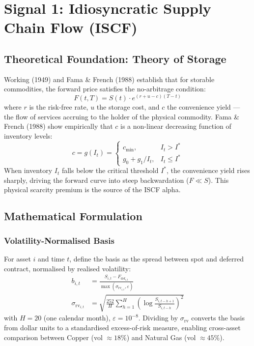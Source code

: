 \documentclass[11pt]{article}
\begin{document}
\section{Signal 1: Idiosyncratic Supply Chain Flow (ISCF)}

\subsection{Theoretical Foundation: Theory of Storage}

Working (1949) and Fama \& French (1988) establish that for storable commodities, the forward price satisfies the no-arbitrage condition:
\begin{equation}
F(t,T) = S(t) \cdot e^{(r + u - c)(T-t)}
\label{eq:no-arbitrage}
\end{equation}
where $r$ is the risk-free rate, $u$ the storage cost, and $c$ the convenience yield --- the flow of services accruing to the holder of the physical commodity. Fama \& French (1988) show empirically that $c$ is a non-linear decreasing function of inventory levels:
\begin{equation}
c = g(I_t) =
\begin{cases}
c_{\min}, & I_t > I^* \\
g_0 + g_1/I_t, & I_t \leq I^*
\end{cases}
\label{eq:convenience-yield}
\end{equation}
When inventory $I_t$ falls below the critical threshold $I^*$, the convenience yield rises sharply, driving the forward curve into steep backwardation ($F \ll S$). This physical scarcity premium is the source of the ISCF alpha.

\subsection{Mathematical Formulation}

\subsubsection{Volatility-Normalised Basis}

For asset $i$ and time $t$, define the basis as the spread between spot and deferred contract, normalised by realised volatility:
\begin{align}
b_{i,t} &= \frac{S_{i,t} - F_{\text{def}_{i,t}}}{\max(\sigma_{\text{rv}_{i,t}}, \varepsilon)} \label{eq:basis} \\
\sigma_{\text{rv}_{i,t}} &= \sqrt{\frac{252}{H} \sum_{h=1}^{H} \left(\log\frac{S_{i,t-h+1}}{S_{i,t-h}}\right)^2} \label{eq:realised-vol}
\end{align}
with $H = 20$ (one calendar month), $\varepsilon = 10^{-8}$. Dividing by $\sigma_{\text{rv}}$ converts the basis from dollar units to a standardised excess-of-risk measure, enabling cross-asset comparison between Copper (vol $\approx 18\%$) and Natural Gas (vol $\approx 45\%$).
\end{document}
